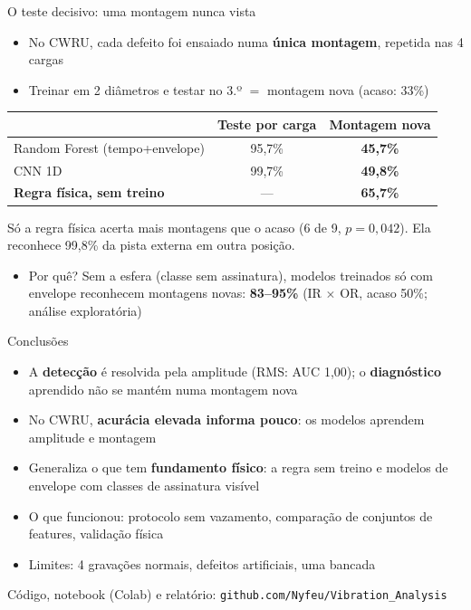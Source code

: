 \documentclass[aspectratio=169,11pt]{beamer}
\newcommand{\destaque}[1]{{\color{laranja}\bfseries #1}}
\newcommand{\nota}[1]{{\color{cinza}\footnotesize #1}}
\begin{document}
\begin{frame}{O teste decisivo: uma montagem nunca vista}
  \begin{itemize}
    \item No CWRU, cada defeito foi ensaiado numa \textbf{única montagem}, repetida nas 4 cargas
    \item Treinar em 2 diâmetros e testar no 3.º $=$ montagem nova \nota{(acaso: 33\%)}
  \end{itemize}
  \vspace{0.5em}
  \centering
  \begin{tabular}{lcc}
    \toprule
    & \textbf{Teste por carga} & \textbf{Montagem nova} \\
    \midrule
    Random Forest (tempo+envelope) & 95,7\% & \destaque{45,7\%} \\
    CNN 1D                         & 99,7\% & \destaque{49,8\%} \\
    \midrule
    \textbf{Regra física, sem treino} & --- & \textbf{65,7\%} \\
    \bottomrule
  \end{tabular}

  \vspace{0.6em}
  \nota{Só a regra física acerta mais montagens que o acaso (6 de 9, $p = 0{,}042$). Ela reconhece 99,8\% da pista externa em outra posição.}

  \vspace{0.4em}
  \begin{itemize}
    \item Por quê? Sem a esfera (classe sem assinatura), modelos treinados só com envelope reconhecem montagens novas: \textbf{83--95\%} \nota{(IR $\times$ OR, acaso 50\%; análise exploratória)}
  \end{itemize}
\end{frame}

\begin{frame}{Conclusões}
  \begin{itemize}
    \item A \textbf{detecção} é resolvida pela amplitude (RMS: AUC 1,00); o \textbf{diagnóstico} aprendido não se mantém numa montagem nova
    \item No CWRU, \textbf{acurácia elevada informa pouco}: os modelos aprendem amplitude e montagem
    \item Generaliza o que tem \textbf{fundamento físico}: a regra sem treino e modelos de envelope com classes de assinatura visível
    \item O que funcionou: protocolo sem vazamento, comparação de conjuntos de features, validação física
    \item Limites: 4 gravações normais, defeitos artificiais, uma bancada
  \end{itemize}
  \vspace{1em}
  \centering
  \nota{Código, notebook (Colab) e relatório: \texttt{github.com/Nyfeu/Vibration\_Analysis}}
\end{frame}
\end{document}
